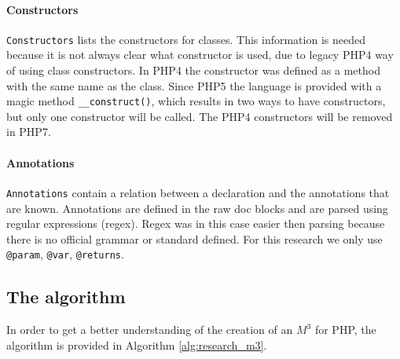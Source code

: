 \documentclass[../main.tex]{subfiles}
\begin{document}
    \paragraph{Constructors} \texttt{Constructors} lists the constructors for classes. 
    This information is needed because it is not always clear what constructor is used, due to legacy PHP4 way of using class constructors.
    In PHP4 the constructor was defined as a method with the same name as the class.
    Since PHP5 the language is provided with a magic method \texttt{\_\_construct()}, which results in two ways to have constructors, but only one constructor will be called.
    The PHP4 constructors will be removed in PHP7.
    
    \paragraph{Annotations} \texttt{Annotations} contain a relation between a declaration and the annotations that are known.
    Annotations are defined in the raw doc blocks and are parsed using regular expressions (regex).
    Regex was in this case easier then parsing because there is no official grammar or standard defined.
    For this research we only use \texttt{@param}, \texttt{@var}, \texttt{@returns}.

    \subsection{The algorithm}
    In order to get a better understanding of the creation of an $M^3$ for PHP, the algorithm is provided in Algorithm \ref{alg:research_m3}.
    
\end{document}
